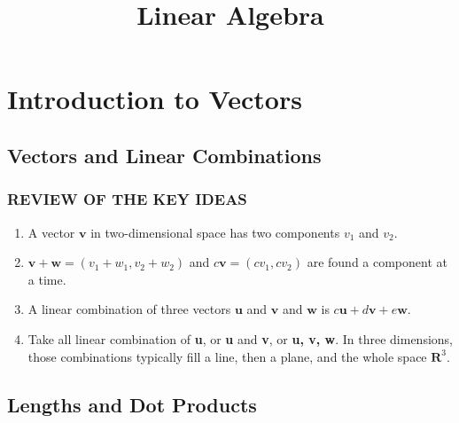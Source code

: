 \documentclass{book}
\begin{document}
\tableofcontents

\title{Linear Algebra}

\chapter{Introduction to Vectors}

\section{Vectors and Linear Combinations}
\subsection*{REVIEW OF THE KEY IDEAS}
    \begin{enumerate}
        \item A vector \( \mathbf{v} \) in two-dimensional space has two components \( v_1 \) and \( v_2 \).
        \item \( \mathbf{v} + \mathbf{w} = (v_1 + w_1, v_2 + w_2) \) and \( c\mathbf{v} = (cv_1, cv_2) \) are found a component at a time.
        \item A linear combination of three vectors \( \mathbf{u} \) and \( \mathbf{v} \) and \( \mathbf{w} \) is \( c \mathbf{u} + d\mathbf{v} + e\mathbf{w}\).
        \item Take all linear combination of \textbf{u}, or \textbf{u} and \textbf{v}, or \textbf{u, v, w}. In three dimensions, those combinations typically fill a line, then a plane, and the whole space \( \mathbf{R}^3\).
    \end{enumerate}

\section{Lengths and Dot Products}
\end{document}
